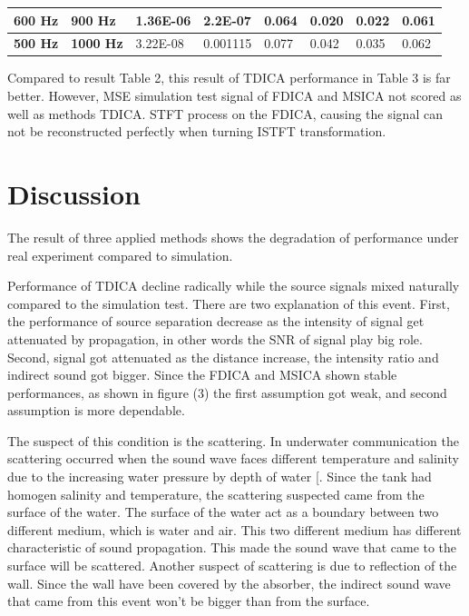 \documentclass[a4paper]{jpconf}
\begin{document}
\begin{table}[b]
\begin{tabular}{|l|l|l|l|l|l|l|l|}
\textbf{600 Hz}                                          & \textbf{900 Hz}                                         & 1.36E-06                            & 2.2E-07                             & 0.064                               & 0.020                               & 0.022                               & 0.061                               \\ \hline
\textbf{500 Hz}                                          & \textbf{1000 Hz}                                        & 3.22E-08                            & 0.001115                            & 0.077                               & 0.042                               & 0.035                               & 0.062                               \\ \hline
\end{tabular}
\end{table}

Compared to result Table 2, this result of TDICA performance in Table 3 is far better. However, MSE simulation test signal of FDICA and MSICA not scored as well as methods TDICA. STFT process on the FDICA, causing the signal can not be reconstructed perfectly when turning ISTFT transformation.

\section{Discussion}
The result of three applied methods shows the degradation of performance under real experiment compared to simulation.

Performance of TDICA decline radically while the source signals mixed naturally compared to the simulation test.  There are two explanation of this event. First, the performance of source separation decrease as the intensity of signal get attenuated by propagation, in other words the SNR of signal play big role. Second, signal got attenuated as the distance increase, the intensity ratio and indirect sound got bigger. Since the FDICA and MSICA shown stable performances, as shown in figure (3) the first assumption got weak, and second assumption is more dependable.

The suspect of this condition is the scattering. In underwater communication the scattering occurred when the sound wave faces different temperature and salinity due to the increasing water pressure by depth of water [. Since the tank had homogen salinity and temperature, the scattering suspected came from the surface of the water. The surface of the water act as a boundary between two different medium, which is water and air. This two different medium has different characteristic of sound propagation. This made the sound wave that came to the surface will be scattered. Another suspect of scattering is due to reflection of the wall. Since the wall have been covered by the absorber, the indirect sound wave that came from this event won’t be bigger than from the surface.
\end{document}
